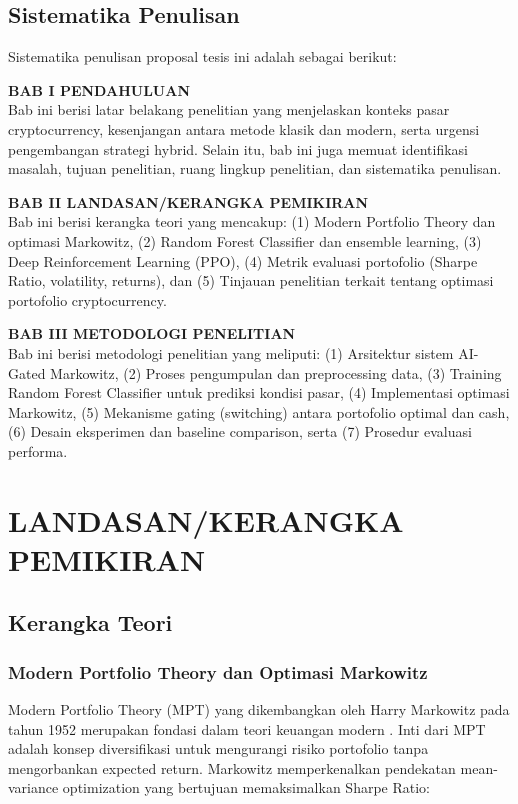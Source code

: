 \documentclass[12pt,a4paper]{article}
\begin{document}
\subsection{Sistematika Penulisan}

Sistematika penulisan proposal tesis ini adalah sebagai berikut:

\textbf{BAB I PENDAHULUAN}\\
Bab ini berisi latar belakang penelitian yang menjelaskan konteks pasar cryptocurrency, kesenjangan antara metode klasik dan modern, serta urgensi pengembangan strategi hybrid. Selain itu, bab ini juga memuat identifikasi masalah, tujuan penelitian, ruang lingkup penelitian, dan sistematika penulisan.

\textbf{BAB II LANDASAN/KERANGKA PEMIKIRAN}\\
Bab ini berisi kerangka teori yang mencakup: (1) Modern Portfolio Theory dan optimasi Markowitz, (2) Random Forest Classifier dan ensemble learning, (3) Deep Reinforcement Learning (PPO), (4) Metrik evaluasi portofolio (Sharpe Ratio, volatility, returns), dan (5) Tinjauan penelitian terkait tentang optimasi portofolio cryptocurrency.

\textbf{BAB III METODOLOGI PENELITIAN}\\
Bab ini berisi metodologi penelitian yang meliputi: (1) Arsitektur sistem AI-Gated Markowitz, (2) Proses pengumpulan dan preprocessing data, (3) Training Random Forest Classifier untuk prediksi kondisi pasar, (4) Implementasi optimasi Markowitz, (5) Mekanisme gating (switching) antara portofolio optimal dan cash, (6) Desain eksperimen dan baseline comparison, serta (7) Prosedur evaluasi performa.

\newpage

\section{LANDASAN/KERANGKA PEMIKIRAN}

\subsection{Kerangka Teori}

\subsubsection{Modern Portfolio Theory dan Optimasi Markowitz}

Modern Portfolio Theory (MPT) yang dikembangkan oleh Harry Markowitz pada tahun 1952 merupakan fondasi dalam teori keuangan modern \cite{markowitz1952portfolio}. Inti dari MPT adalah konsep diversifikasi untuk mengurangi risiko portofolio tanpa mengorbankan expected return. Markowitz memperkenalkan pendekatan mean-variance optimization yang bertujuan memaksimalkan Sharpe Ratio:
\end{document}
